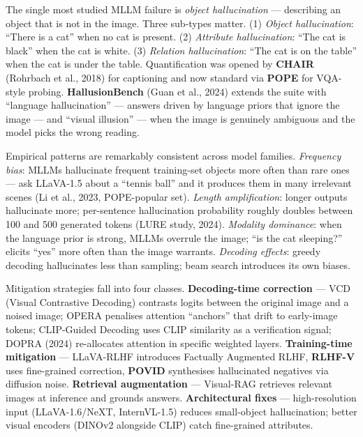 \documentclass{article}
\begin{document}
The single most studied MLLM failure is \emph{object hallucination} --- describing an object that is not in the image. Three sub-types matter. (1) \emph{Object hallucination}: ``There is a cat'' when no cat is present. (2) \emph{Attribute hallucination}: ``The cat is black'' when the cat is white. (3) \emph{Relation hallucination}: ``The cat is on the table'' when the cat is under the table. Quantification was opened by \textbf{CHAIR} (Rohrbach et al., 2018) for captioning and now standard via \textbf{POPE} \citep{li2023blip2bootstrapping} for VQA-style probing. \textbf{HallusionBench} (Guan et al., 2024) extends the suite with ``language hallucination'' --- answers driven by language priors that ignore the image --- and ``visual illusion'' --- when the image is genuinely ambiguous and the model picks the wrong reading.

Empirical patterns are remarkably consistent across model families. \emph{Frequency bias}: MLLMs hallucinate frequent training-set objects more often than rare ones --- ask LLaVA-1.5 about a ``tennis ball'' and it produces them in many irrelevant scenes (Li et al., 2023, POPE-popular set). \emph{Length amplification}: longer outputs hallucinate more; per-sentence hallucination probability roughly doubles between 100 and 500 generated tokens (LURE study, 2024). \emph{Modality dominance}: when the language prior is strong, MLLMs overrule the image; ``is the cat sleeping?'' elicits ``yes'' more often than the image warrants. \emph{Decoding effects}: greedy decoding hallucinates less than sampling; beam search introduces its own biases.

Mitigation strategies fall into four classes. \textbf{Decoding-time correction} --- VCD (Visual Contrastive Decoding) contrasts logits between the original image and a noised image; OPERA penalises attention ``anchors'' that drift to early-image tokens; CLIP-Guided Decoding \citep{deng2024seeingisbelievingm} uses CLIP similarity as a verification signal; DOPRA (2024) re-allocates attention in specific weighted layers. \textbf{Training-time mitigation} --- LLaVA-RLHF \citep{sun20242024} introduces Factually Augmented RLHF, \textbf{RLHF-V} uses fine-grained correction, \textbf{POVID} synthesises hallucinated negatives via diffusion noise. \textbf{Retrieval augmentation} --- Visual-RAG retrieves relevant images at inference and grounds answers. \textbf{Architectural fixes} --- high-resolution input (LLaVA-1.6/NeXT, InternVL-1.5) reduces small-object hallucination; better visual encoders (DINOv2 alongside CLIP) catch fine-grained attributes.
\end{document}
